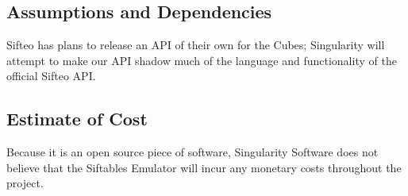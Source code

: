 \documentclass[12pt]{article}
\begin{document}
              \subsection{Assumptions and Dependencies}
              Sifteo has plans to release an \gls{API} of their own for the Cubes; Singularity will attempt to make our \gls{API} shadow much of the language and functionality of the official Sifteo \gls{API}. 

              \subsection{Estimate of Cost}
			  Because it is an \gls{open source} piece of software, Singularity Software does not believe that the Siftables Emulator will incur any monetary costs throughout the project.
\clearpage
\end{document}

